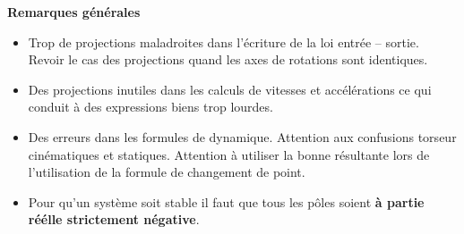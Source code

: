 \documentclass[10pt,fleqn]{book} %
\begin{document}
\renewcommand{\xxtitreexo}{Devoir du 13 janvier 2025}


\pagestyle{fancy}
\thispagestyle{plain}


\def\columnseprulecolor{\color{ocre}}
\setlength{\columnseprule}{0pt} 



\vspace{6cm}
%

\textbf{Remarques générales}
\begin{itemize}
\item Trop de projections maladroites dans l'écriture de la loi entrée -- sortie. Revoir le cas des projections quand les axes de rotations sont identiques. 
\item Des projections inutiles dans les calculs de vitesses et accélérations ce qui conduit à des expressions biens trop lourdes.
\item Des erreurs dans les formules de dynamique. Attention aux confusions torseur cinématiques et statiques. Attention à utiliser la bonne résultante lors de l'utilisation de la formule de changement de point.
\item Pour qu'un système soit stable il faut que tous les pôles soient \textbf{à partie réélle strictement négative}.
\end{itemize}




\end{document}
